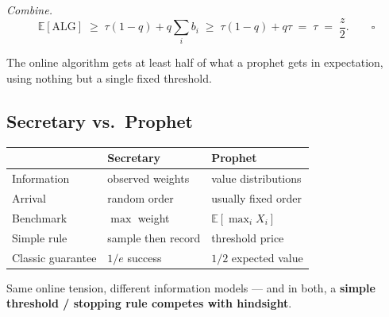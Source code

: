 \emph{Combine.}
\[
\mathbb{E}[\mathrm{ALG}] \;\ge\; \tau(1-q) + q\sum_i b_i \;\ge\; \tau(1-q) + q\tau \;=\; \tau \;=\; \frac{z}{2}. \qquad\square
\]

The online algorithm gets at least half of what a prophet gets in expectation, using nothing but a single fixed threshold.

\subsection{Secretary vs.\ Prophet}

\begin{center}
\begin{tabular}{lll}
\toprule
 & \textbf{Secretary} & \textbf{Prophet} \\
\midrule
Information       & observed weights   & value distributions \\
Arrival           & random order       & usually fixed order \\
Benchmark         & $\max$ weight      & $\mathbb{E}[\max_i X_i]$ \\
Simple rule       & sample then record & threshold price \\
Classic guarantee & $1/e$ success      & $1/2$ expected value \\
\bottomrule
\end{tabular}
\end{center}

Same online tension, different information models --- and in both, a \textbf{simple threshold / stopping rule competes with hindsight}.